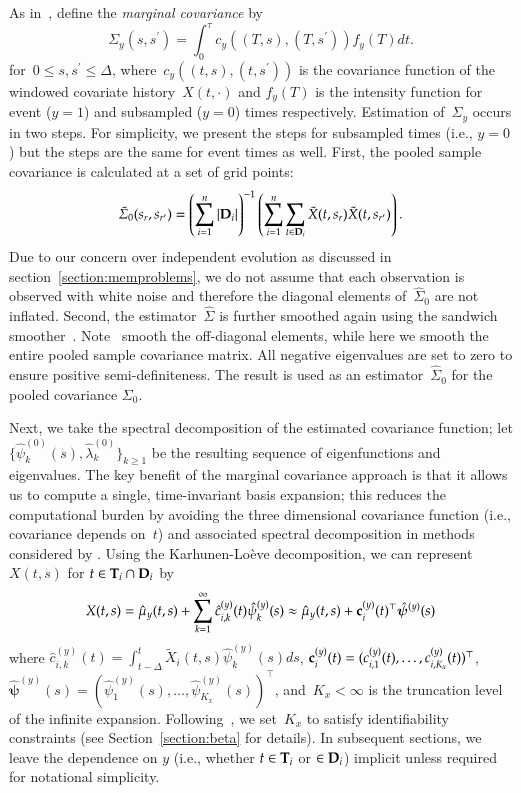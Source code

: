 \documentclass[12pt]{amsart}
\def\bfT{{\bf T}}
\def\bfD{{\bf D}}
\begin{document}
As in~\cite{Park2018}, define the \emph{marginal covariance} by
\[
\Sigma_y (s, s^\prime) = \int_{0}^\tau c_y( (T,s), (T,s^\prime) ) f_y(T) dt.
\]
for~$0 \leq s,s^\prime \leq \Delta$, where~$c_y((t,s), (t,s^\prime))$ is the covariance function of the windowed covariate history~$X(t,\cdot)$ and $f_y(T)$ is the intensity function for event ($y=1$) and subsampled ($y=0$) times respectively. Estimation of~$\Sigma_y$ occurs in two steps. For simplicity, we present the steps for subsampled times (i.e., $y=0$) but the steps are the same for event times as well. First, the pooled sample covariance is calculated at a set of grid points:
\[
\tilde \Sigma_0 (s_r , s_{r^\prime}) = \left( \sum_{i=1}^n \left | \bfD_i \right |\right)^{-1} \left( \sum_{i=1}^n \sum_{t \in \bfD_i} \tilde X (t,s_r) \tilde X (t,s_{r^\prime}) \right).
\]
Due to our concern over independent evolution as discussed in section~\ref{section:memproblems}, we do not assume that each observation is observed with white noise and therefore the diagonal elements of~$\hat \Sigma_0$ are not inflated. Second, the estimator~$\hat \Sigma$ is further smoothed again using the sandwich smoother~\citep{Xiao2013}. Note~\cite{Park2018} smooth the off-diagonal elements, while here we smooth the entire pooled sample covariance matrix. All negative eigenvalues are set to zero to ensure positive semi-definiteness. The result is used as an estimator~$\hat \Sigma_0$ for the pooled covariance $\Sigma_0$.

Next, we take the spectral decomposition of the estimated covariance function; let $\{ \hat \psi^{(0)}_k (s),\hat \lambda^{(0)}_k \}_{k \geq 1}$ be the resulting sequence of eigenfunctions and eigenvalues. The key benefit of the marginal covariance approach is that it allows us to compute a single, time-invariant basis expansion; this reduces the computational burden by avoiding the three dimensional covariance function (i.e., covariance depends on~$t$) and associated spectral decomposition in methods considered by \cite{ChenMuller2012}. Using the Karhunen-Lo{\`e}ve decomposition, we can represent~$X(t,s)$ for $t \in \bfT_i \cap \bfD_i$ by
\[
X(t,s) = \hat \mu_y (t,s) + \sum_{k=1}^{\infty} \hat c^{(y)}_{i,k} (t) \hat
\psi^{(y)}_k (s) \approx \hat \mu_y (t,s) + {\bf c}^{(y)}_{i} (t)^\top \mathbold{\hat
  \psi}^{(y)} (s)
\]
where $\hat c^{(y)}_{i,k} (t) = \int_{t-\Delta}^t \tilde X_i (t,s) \hat \psi^{(y)}_k (s) ds$, ${\bf c}^{(y)}_i (t) = (c^{(y)}_{i,1} (t), \ldots, c^{(y)}_{i,K_x} (t))^\top$, $\mathbold{\hat \psi}^{(y)} (s) = (\hat \psi^{(y)}_1 (s), \ldots, \hat \psi^{(y)}_{K_x} (s))^\top$, and~$K_x < \infty$ is the truncation level of the infinite expansion. Following~\cite{Goldsmith2011}, we set~$K_x$ to satisfy identifiability constraints (see Section~\ref{section:beta} for details). In subsequent sections, we leave the dependence on $y$ (i.e., whether $t \in \bfT_i$ or $\in \bfD_i$) implicit unless required for notational simplicity.
\end{document}
